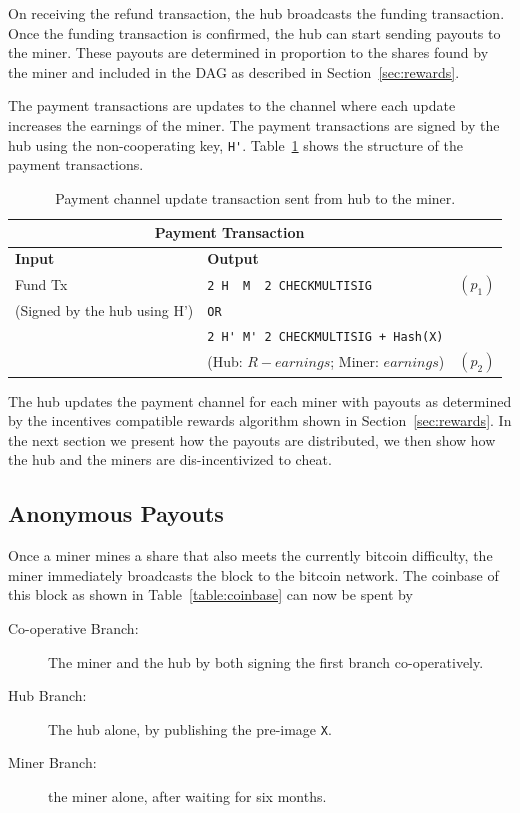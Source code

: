 \documentclass{article}
\begin{document}
On receiving the refund transaction, the hub broadcasts the funding
transaction. Once the funding transaction is confirmed, the hub can
start sending payouts to the miner. These payouts are determined in
proportion to the shares found by the miner and included in the DAG as
described in Section~\ref{sec:rewards}.

The payment transactions are updates to the channel where each update
increases the earnings of the miner. The payment transactions are
signed by the hub using the non-cooperating key, \verb|H'|.
Table~\ref{payment-transaction} shows the structure of the payment
transactions.

\begin{table}
  \centering
  \begin{tabular}{ llr }
    \multicolumn{2}{c}{\bfseries Payment Transaction} \\
    \midrule
    \bfseries Input & \bfseries Output \\
    \midrule
    Fund Tx & \verb|2 H  M  2 CHECKMULTISIG| & $(p_1)$ \\
    (Signed by the hub using H') & \verb|OR| \\
                    & \verb|2 H' M' 2 CHECKMULTISIG + Hash(X)| \\
                    & (Hub: $R - earnings$; Miner: $earnings$) & $(p_2)$\\
    \midrule
  \end{tabular}
  \caption{Payment channel update transaction sent from hub to the
    miner.}\label{payment-transaction}
\end{table}

The hub updates the payment channel for each miner with payouts as
determined by the incentives compatible rewards algorithm shown in
Section~\ref{sec:rewards}. In the next section we present how the
payouts are distributed, we then show how the hub and the miners are
dis-incentivized to cheat.

\subsection{Anonymous Payouts}

Once a miner mines a share that also meets the currently bitcoin
difficulty, the miner immediately broadcasts the block to the bitcoin
network. The coinbase of this block as shown in
Table~\ref{table:coinbase} can now be spent by

\begin{description}
\item[Co-operative Branch:] The miner and the hub by both signing the
  first branch co-operatively.
\item[Hub Branch:] The hub alone, by publishing the pre-image \verb|X|.
\item[Miner Branch:] the miner alone, after waiting for six months.
\end{description}
\end{document}
